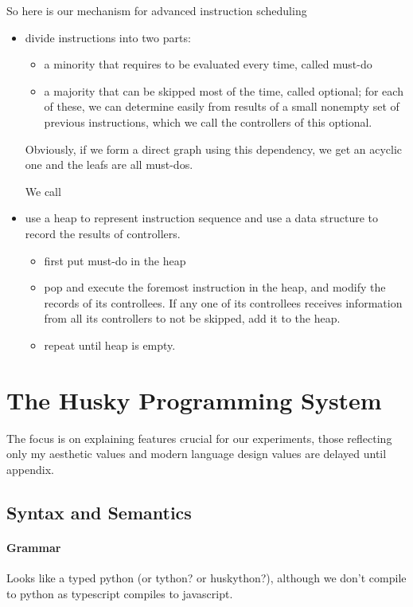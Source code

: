 \documentclass[10pt, oneside]{article}   	%
\theoremstyle{definition}
\begin{document}
So here is our mechanism for advanced instruction scheduling
\begin{itemize}
	\item divide instructions into two parts:
	\begin{itemize}
		\item a minority that requires to be evaluated every time, called must-do
		\item a majority that can be skipped most of the time, called optional; for each of these, we can determine easily from results of a small nonempty set of previous instructions, which we call the controllers of this optional.
	\end{itemize}

	Obviously, if we form a direct graph using this dependency, we get an acyclic one and the leafs are all must-dos.

	We call 

	\item use a heap to represent instruction sequence and use a data structure to record the results of controllers.
	\begin{itemize}
		\item first put must-do in the heap
		\item pop and execute the foremost instruction in the heap, and modify the records of its controllees. If any one of its controllees receives information from all its controllers to not be skipped, add it to the heap.
		\item repeat until heap is empty.
	\end{itemize}
\end{itemize}

\section{The Husky Programming System}
The focus is on explaining features crucial for our experiments, those reflecting only my aesthetic values and modern language design values are delayed until appendix.
\subsection{Syntax and Semantics}

\paragraph{Grammar} Looks like a typed python (or tython? or huskython?), although we don't compile to python as typescript compiles to javascript.
\end{document}
